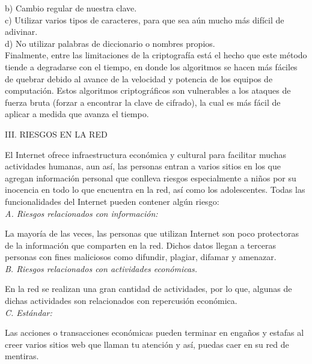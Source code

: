 \documentclass[9pt,24pt,twocolumn]{article}
\begin{document}
{b)  Cambio regular de nuestra clave.}
\\

{c) Utilizar varios tipos de caracteres, para que sea aún mucho más difícil de adivinar.}
\\

{d)  No utilizar palabras de diccionario o nombres propios.}
\\

{Finalmente, entre las limitaciones de la criptografía está el hecho que este método tiende a degradarse con el tiempo, en donde los algoritmos se hacen más fáciles de quebrar debido al avance de la velocidad y potencia de los equipos de computación. Estos algoritmos criptográficos son vulnerables a los ataques de fuerza bruta (forzar a encontrar la clave de cifrado), la cual es más fácil de aplicar a medida que avanza el tiempo.}
\\

\begin{center}
{III. RIESGOS EN LA RED}
\end{center}

{El Internet ofrece infraestructura económica y cultural para facilitar muchas actividades humanas, aun así, las personas entran a varios sitios en los que agregan información personal que conlleva riesgos especialmente a niños por su inocencia en todo lo que encuentra en la red, así como los adolescentes. Todas las funcionalidades del Internet pueden contener algún riesgo:}
\\


\textit{A.  Riesgos relacionados con información:}

{La mayoría de las veces, las personas que utilizan Internet son poco protectoras de la información que comparten en la red. Dichos datos llegan a terceras personas con fines maliciosos como difundir, plagiar, difamar y amenazar.}
\\

\textit{B.  Riesgos relacionados con actividades económicas. }

{En la red se realizan una gran cantidad de actividades, por lo que, algunas de dichas actividades son relacionados con repercusión económica.}
\\

\textit{C.  Estándar:  }

{Las acciones o transacciones económicas pueden terminar en engaños y estafas al creer varios sitios web que llaman tu atención y así, puedas caer en su red de mentiras.}
\\
\end{document}
